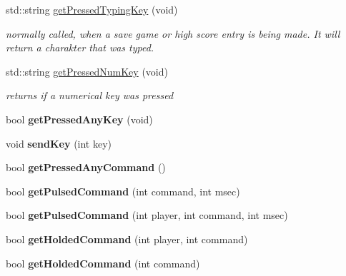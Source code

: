\begin{DoxyCompactItemize}
\item 
std::string \hyperlink{class_c_input_abf9c66d7c259956419d89921fcda458d}{getPressedTypingKey} (void)
\begin{DoxyCompactList}\small\item\em normally called, when a save game or high score entry is being made. It will return a charakter that was typed. \item\end{DoxyCompactList}\item 
std::string \hyperlink{class_c_input_a6c6b514e6ace12a26f232c6d87af6b65}{getPressedNumKey} (void)
\begin{DoxyCompactList}\small\item\em returns if a numerical key was pressed \item\end{DoxyCompactList}\item 
\hypertarget{class_c_input_acf611d20d7c5f3c2bdc0737804b315b4}{
bool {\bfseries getPressedAnyKey} (void)}
\label{class_c_input_acf611d20d7c5f3c2bdc0737804b315b4}

\item 
\hypertarget{class_c_input_a3fc1c132a71d9b6edb410852c44af3f0}{
void {\bfseries sendKey} (int key)}
\label{class_c_input_a3fc1c132a71d9b6edb410852c44af3f0}

\item 
\hypertarget{class_c_input_a12c9198267f2bb50cf04b5850765949d}{
bool {\bfseries getPressedAnyCommand} ()}
\label{class_c_input_a12c9198267f2bb50cf04b5850765949d}

\item 
\hypertarget{class_c_input_aecf90a6feda73995fc067fe4f4228b78}{
bool {\bfseries getPulsedCommand} (int command, int msec)}
\label{class_c_input_aecf90a6feda73995fc067fe4f4228b78}

\item 
\hypertarget{class_c_input_a915996d26718ca0d0703dee2c89bf0a5}{
bool {\bfseries getPulsedCommand} (int player, int command, int msec)}
\label{class_c_input_a915996d26718ca0d0703dee2c89bf0a5}

\item 
\hypertarget{class_c_input_ab1f4cdd2a5d08632f6edfac49141f718}{
bool {\bfseries getHoldedCommand} (int player, int command)}
\label{class_c_input_ab1f4cdd2a5d08632f6edfac49141f718}

\item 
\hypertarget{class_c_input_a376d9cff6c4d0e4e22f4766e78e3e75c}{
bool {\bfseries getHoldedCommand} (int command)}
\label{class_c_input_a376d9cff6c4d0e4e22f4766e78e3e75c}


\end{DoxyCompactItemize}
